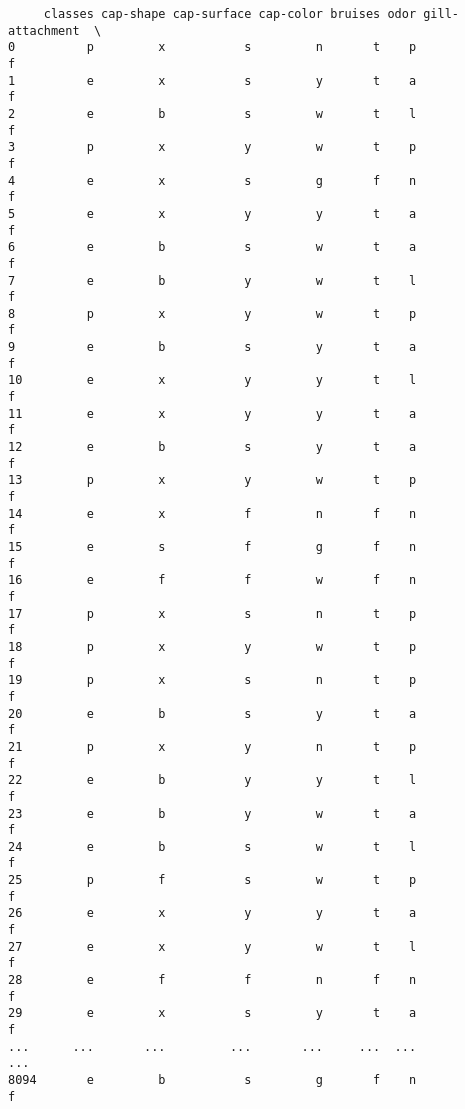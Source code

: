 \documentclass[11pt]{article}
\begin{document}
    
    \begin{verbatim}
     classes cap-shape cap-surface cap-color bruises odor gill-attachment  \
0          p         x           s         n       t    p               f   
1          e         x           s         y       t    a               f   
2          e         b           s         w       t    l               f   
3          p         x           y         w       t    p               f   
4          e         x           s         g       f    n               f   
5          e         x           y         y       t    a               f   
6          e         b           s         w       t    a               f   
7          e         b           y         w       t    l               f   
8          p         x           y         w       t    p               f   
9          e         b           s         y       t    a               f   
10         e         x           y         y       t    l               f   
11         e         x           y         y       t    a               f   
12         e         b           s         y       t    a               f   
13         p         x           y         w       t    p               f   
14         e         x           f         n       f    n               f   
15         e         s           f         g       f    n               f   
16         e         f           f         w       f    n               f   
17         p         x           s         n       t    p               f   
18         p         x           y         w       t    p               f   
19         p         x           s         n       t    p               f   
20         e         b           s         y       t    a               f   
21         p         x           y         n       t    p               f   
22         e         b           y         y       t    l               f   
23         e         b           y         w       t    a               f   
24         e         b           s         w       t    l               f   
25         p         f           s         w       t    p               f   
26         e         x           y         y       t    a               f   
27         e         x           y         w       t    l               f   
28         e         f           f         n       f    n               f   
29         e         x           s         y       t    a               f   
...      ...       ...         ...       ...     ...  ...             ...   
8094       e         b           s         g       f    n               f   

\end{verbatim}
\end{document}
